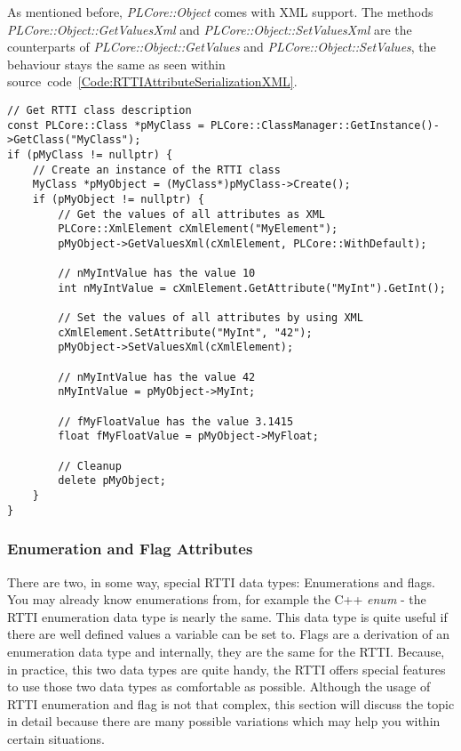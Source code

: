 As mentioned before, \emph{PLCore::Object} comes with \ac{XML} support. The methods \emph{PLCore::Object::GetValuesXml} and \emph{PLCore::Object::SetValuesXml} are the counterparts of \emph{PLCore::Object::GetValues} and \emph{PLCore::Object::SetValues}, the behaviour stays the same as seen within source~code~\ref{Code:RTTIAttributeSerializationXML}.
\begin{lstlisting}[label=Code:RTTIAttributeSerializationXML,caption={\ac{RTTI} object attributes serialization by using \ac{XML}}]
// Get RTTI class description
const PLCore::Class *pMyClass = PLCore::ClassManager::GetInstance()->GetClass("MyClass");
if (pMyClass != nullptr) {
	// Create an instance of the RTTI class
	MyClass *pMyObject = (MyClass*)pMyClass->Create();
	if (pMyObject != nullptr) {
		// Get the values of all attributes as XML
		PLCore::XmlElement cXmlElement("MyElement");
		pMyObject->GetValuesXml(cXmlElement, PLCore::WithDefault);

		// nMyIntValue has the value 10
		int nMyIntValue = cXmlElement.GetAttribute("MyInt").GetInt();

		// Set the values of all attributes by using XML
		cXmlElement.SetAttribute("MyInt", "42");
		pMyObject->SetValuesXml(cXmlElement);

		// nMyIntValue has the value 42
		nMyIntValue = pMyObject->MyInt;

		// fMyFloatValue has the value 3.1415
		float fMyFloatValue = pMyObject->MyFloat;

		// Cleanup
		delete pMyObject;
	}
}
\end{lstlisting}



\subsubsection{Enumeration and Flag Attributes}
\label{ClassMembers:EnumerationAndFlagAttributes}
There are two, in some way, special \ac{RTTI} data types: Enumerations and flags. You may already know enumerations from, for example the C++ \emph{enum} - the \ac{RTTI} enumeration data type is nearly the same. This data type is quite useful if there are well defined values a variable can be set to. Flags are a derivation of an enumeration data type and internally, they are the same for the \ac{RTTI}. Because, in practice, this two data types are quite handy, the \ac{RTTI} offers special features to use those two data types as comfortable as possible. Although the usage of \ac{RTTI} enumeration and flag is not that complex, this section will discuss the topic in detail because there are many possible variations which may help you within certain situations.


